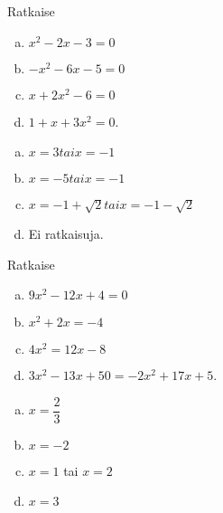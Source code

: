 \begin{tehtavasivu}
\begin{tehtava}
    Ratkaise
    \begin{enumerate}[a)]
        \item $x^2 - 2x - 3 = 0$
        \item $-x^2 - 6x - 5 = 0$
        \item $x + 2x^2 - 6= 0$
        \item $1 + x + 3x^2= 0$.
    \end{enumerate}
    \begin{vastaus}
        \begin{enumerate}[a)]
            \item $x = 3 tai x = -1$
            \item $x = -5 tai x = -1$
            \item $x = -1 + \sqrt{2} tai x = -1 - \sqrt{2}$
            \item Ei ratkaisuja.
        \end{enumerate}
    \end{vastaus}
\end{tehtava}

\begin{tehtava}
    Ratkaise
    \begin{enumerate}[a)]
        \item $9x^2 - 12x + 4 = 0$
        \item $x^2 + 2x = -4$
        \item $4x^2 = 12x - 8$
        \item $3x^2 - 13x + 50 = -2x^2 + 17x + 5$.
    \end{enumerate}
    \begin{vastaus}
        \begin{enumerate}[a)]
            \item $x = \dfrac{2}{3}$
            \item $x = -2$
            \item $x = 1$ tai $x = 2$
            \item $x = 3$
        \end{enumerate}
    \end{vastaus}
\end{tehtava}


\end{tehtavasivu}
